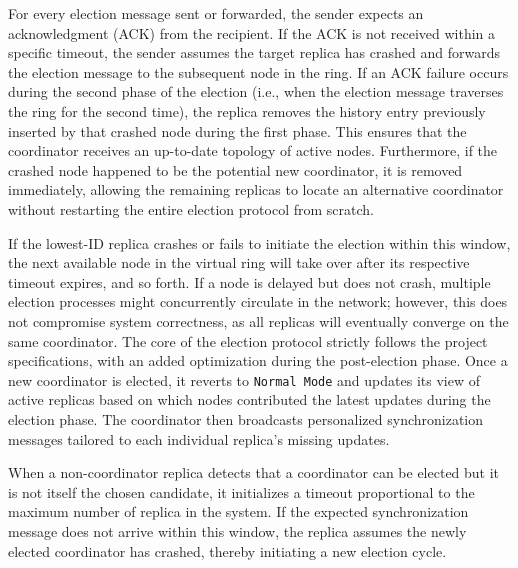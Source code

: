 For every election message sent or forwarded, the sender expects an acknowledgment (ACK) from the recipient. If the ACK is not received within a specific timeout, the sender assumes the target replica has crashed and forwards the election message to the subsequent node in the ring.
If an ACK failure occurs during the second phase of the election (i.e., when the election message traverses the ring for the second time), the replica removes the history entry previously inserted by that crashed node during the first phase. This ensures that the coordinator receives an up-to-date topology of active nodes. Furthermore, if the crashed node happened to be the potential new coordinator, it is removed immediately, allowing the remaining replicas to locate an alternative coordinator without restarting the entire election protocol from scratch.

If the lowest-ID replica crashes or fails to initiate the election within this window, the next available node in the virtual ring will take over after its respective timeout expires, and so forth. If a node is delayed but does not crash, multiple election processes might concurrently circulate in the network; however, this does not compromise system correctness, as all replicas will eventually converge on the same coordinator.
The core of the election protocol strictly follows the project specifications, with an added optimization during the post-election phase. Once a new coordinator is elected, it reverts to \texttt{Normal Mode} and updates its view of active replicas based on which nodes contributed the latest updates during the election phase. 
The coordinator then broadcasts personalized synchronization messages tailored to each individual replica's missing updates.

When a non-coordinator replica detects that a coordinator can be elected but it is not itself the chosen candidate, it initializes a timeout proportional to the maximum number of replica in the system. If the expected synchronization message does not arrive within this window, the replica assumes the newly elected coordinator has crashed, thereby initiating a new election cycle.

